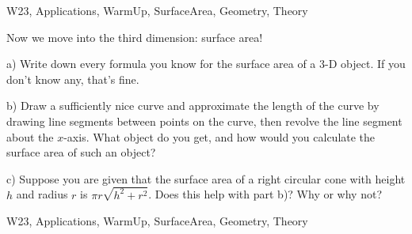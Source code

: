 \begin{tagblock}{W23, Applications, WarmUp, SurfaceArea, Geometry, Theory}
\begin{question}

Now we move into the third dimension: surface area!

\bigskip

a) Write down every formula you know for the surface area of a 3-D object. If you don't know any, that's fine. 

\bigskip

b) Draw a sufficiently nice curve and approximate the length of the curve by drawing line segments between points on the curve, then revolve the line segment about the $x$-axis. What object do you get, and how would you calculate the surface area of such an object?

\bigskip

c) Suppose you are given that the surface area of a right circular cone with height $h$ and radius $r$ is $\pi r\sqrt{h^2+r^2}$. Does this help with part b)? Why or why not?

    
\begin{tags}
        W23, Applications, WarmUp, SurfaceArea, Geometry, Theory
\end{tags}
    
\begin{diary}
\end{diary}
	
\begin{solution}

\end{solution}
	
\end{question}

\end{tagblock}

